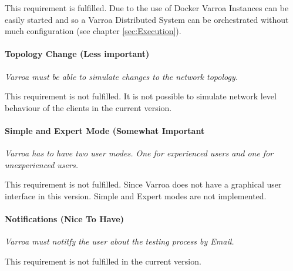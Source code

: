 This requirement is fulfilled. Due to the use of Docker Varroa Instances can be easily started and so a Varroa Distributed System can be orchestrated without much configuration (see chapter \ref{sec:Execution}).

\paragraph{Topology Change (Less important)}
\emph{Varroa must be able to simulate changes to the network topology.}

This requirement is not fulfilled.
It is not possible to simulate network level behaviour of the clients in the current version.

\paragraph{Simple and Expert Mode (Somewhat Important}
\emph{Varroa has to have two user modes.
One for experienced users and one for unexperienced users.}

This requirement is not fulfilled.
Since Varroa does not have a graphical user interface in this version.
Simple and Expert modes are not implemented.


\paragraph{Notifications (Nice To Have)}
\emph{Varroa must notitfy the user about the testing process by Email.}

This requirement is not fulfilled in the current version.


















